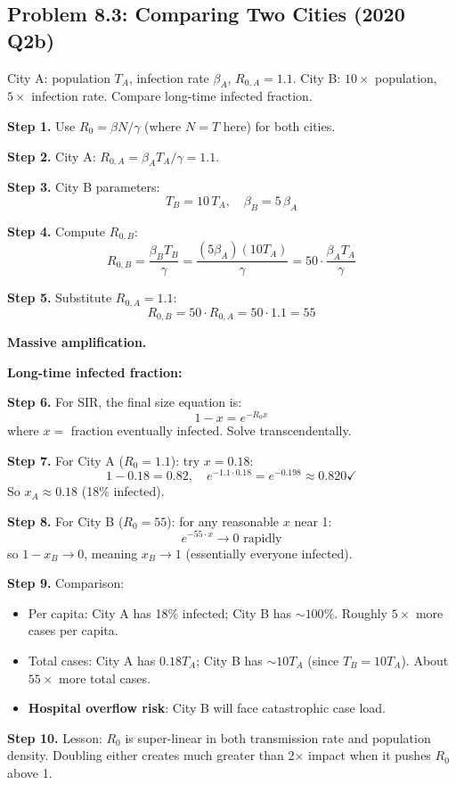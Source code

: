 \documentclass[10pt]{article}
\begin{document}
\subsection{Problem 8.3: Comparing Two Cities (2020 Q2b)}

\begin{problem}
City A: population $T_A$, infection rate $\beta_A$, $R_{0,A} = 1.1$. City B: $10\times$ population, $5\times$ infection rate. Compare long-time infected fraction.
\end{problem}

\begin{solution}
\textbf{Step 1.} Use $R_0 = \beta N/\gamma$ (where $N = T$ here) for both cities.

\textbf{Step 2.} City A: $R_{0,A} = \beta_A T_A/\gamma = 1.1$.

\textbf{Step 3.} City B parameters:
\[
T_B = 10\,T_A, \quad \beta_B = 5\,\beta_A
\]

\textbf{Step 4.} Compute $R_{0,B}$:
\[
R_{0,B} = \frac{\beta_B T_B}{\gamma} = \frac{(5\beta_A)(10 T_A)}{\gamma} = 50\cdot\frac{\beta_A T_A}{\gamma}
\]

\textbf{Step 5.} Substitute $R_{0,A} = 1.1$:
\[
R_{0,B} = 50\cdot R_{0,A} = 50\cdot 1.1 = 55
\]

\textbf{Massive amplification.}

\medskip\textbf{Long-time infected fraction:}

\textbf{Step 6.} For SIR, the final size equation is:
\[
1 - x = e^{-R_0 x}
\]
where $x = $ fraction eventually infected. Solve transcendentally.

\textbf{Step 7.} For City A ($R_0 = 1.1$): try $x = 0.18$:
\[
1 - 0.18 = 0.82, \quad e^{-1.1\cdot 0.18} = e^{-0.198} \approx 0.820 \checkmark
\]
So $x_A \approx 0.18$ (18\% infected).

\textbf{Step 8.} For City B ($R_0 = 55$): for any reasonable $x$ near 1:
\[
e^{-55\cdot x} \to 0 \text{ rapidly}
\]
so $1 - x_B \to 0$, meaning $x_B \to 1$ (essentially everyone infected).

\textbf{Step 9.} Comparison:
\begin{itemize}
\item Per capita: City A has 18\% infected; City B has $\sim 100\%$. Roughly $5\times$ more cases per capita.
\item Total cases: City A has $0.18 T_A$; City B has $\sim 10 T_A$ (since $T_B = 10T_A$). About $55\times$ more total cases.
\item \textbf{Hospital overflow risk}: City B will face catastrophic case load.
\end{itemize}

\textbf{Step 10.} Lesson: $R_0$ is super-linear in both transmission rate and population density. Doubling either creates much greater than 2× impact when it pushes $R_0$ above 1.
\end{solution}
\end{document}
